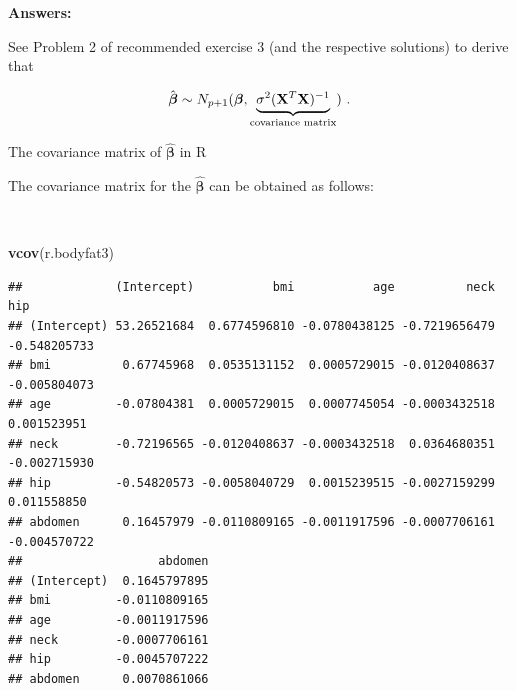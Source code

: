 \documentclass[
  10pt,
  ignorenonframetext,
]{beamer}
\newenvironment{Shaded}{\begin{snugshade}}{\end{snugshade}}
\newcommand{\FunctionTok}[1]{\textcolor[rgb]{0.13,0.29,0.53}{\textbf{#1}}}
\newcommand{\NormalTok}[1]{#1}
\begin{document}
\begin{frame}
\textbf{Answers:}

See Problem 2 of recommended exercise 3 (and the respective solutions)
to derive that

\[\hat{\boldsymbol\beta}\sim N_{p+1}(\boldsymbol{\beta},\underbrace{\sigma^2({\bf X}^T{\bf X})^{-1}}_{\text{covariance matrix}}) \ . \]
\end{frame}

\begin{frame}[fragile]
\begin{block}{The covariance matrix of \(\boldsymbol{\hat\beta}\) in R}
\protect\hypertarget{the-covariance-matrix-of-boldsymbolhatbeta-in-r}{}
\(~\)

The covariance matrix for the \(\boldsymbol{\hat\beta}\) can be obtained
as follows:

\(~\)

\scriptsize

\begin{Shaded}
\begin{Highlighting}[]
\FunctionTok{vcov}\NormalTok{(r.bodyfat3)}
\end{Highlighting}
\end{Shaded}

\begin{verbatim}
##             (Intercept)           bmi           age          neck          hip
## (Intercept) 53.26521684  0.6774596810 -0.0780438125 -0.7219656479 -0.548205733
## bmi          0.67745968  0.0535131152  0.0005729015 -0.0120408637 -0.005804073
## age         -0.07804381  0.0005729015  0.0007745054 -0.0003432518  0.001523951
## neck        -0.72196565 -0.0120408637 -0.0003432518  0.0364680351 -0.002715930
## hip         -0.54820573 -0.0058040729  0.0015239515 -0.0027159299  0.011558850
## abdomen      0.16457979 -0.0110809165 -0.0011917596 -0.0007706161 -0.004570722
##                   abdomen
## (Intercept)  0.1645797895
## bmi         -0.0110809165
## age         -0.0011917596
## neck        -0.0007706161
## hip         -0.0045707222
## abdomen      0.0070861066
\end{verbatim}
\end{block}
\end{frame}
\end{document}
